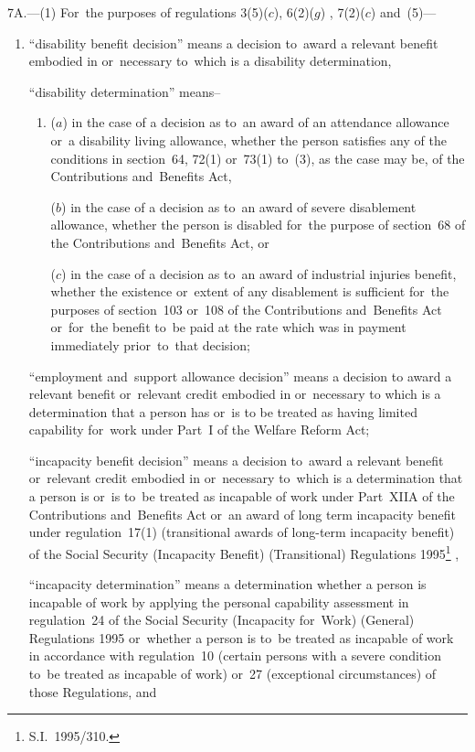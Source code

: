 \documentclass[12pt,a4paper]{article}
\begin{document}
7A.---(1)  For~the purposes of regulations 3(5)($c$), 6(2)($g$)%
, 7(2)($c$) and~(5)---  %
\begin{enumerate}\item[]
“disability benefit decision” means a decision to~award a relevant benefit embodied in or~necessary to~which is a disability determination,

“disability determination” means–
\begin{enumerate}\item[]
($a$)
in the case of a decision as to~an award of an attendance allowance or~a disability living allowance, whether the person satisfies any of the conditions in section~64, 72(1) or~73(1) to~(3), as the case may be, of the Contributions and~Benefits Act,

($b$)
in the case of a decision as to~an award of severe disablement allowance, whether the person is disabled for~the purpose of section~68 of the Contributions and~Benefits Act, or

($c$)
in the case of a decision as to~an award of industrial injuries benefit, whether the existence or~extent of any disablement is sufficient for~the purposes of section~103 or~108 of the Contributions and~Benefits Act or~for~the benefit to~be paid at the rate which was in payment immediately prior~to~that decision;
\end{enumerate}

“employment and~support allowance decision” means a decision to award a relevant benefit or~relevant credit embodied in or~necessary to which is a determination that a person has or~is to be treated as having limited capability for~work under Part~I of the Welfare Reform Act;

“incapacity benefit decision” means a decision to~award a relevant benefit 
or~relevant credit  %
embodied in or~necessary to~which is a determination that a person is or~is to~be treated as incapable of work under Part~XIIA of the Contributions and~Benefits Act
or~an award of long term incapacity benefit under regulation~17(1) (transitional awards of long-term incapacity benefit) of the Social Security (Incapacity Benefit) (Transitional) Regulations 1995\footnote{S.I.~1995/310.}%
,

\begin{sloppypar}
“incapacity determination” means a determination whether a person is incapable of work by applying the 
personal capability assessment  %
in regulation~24 of the Social Security (Incapacity for~Work) (General) Regulations 1995 or~whether a person is to~be treated as incapable of work in accordance with regulation~10 (certain persons with a severe condition to~be treated as incapable of work) or~27 (exceptional circumstances) of those Regulations, and
\end{sloppypar}


\end{enumerate}
\end{document}
